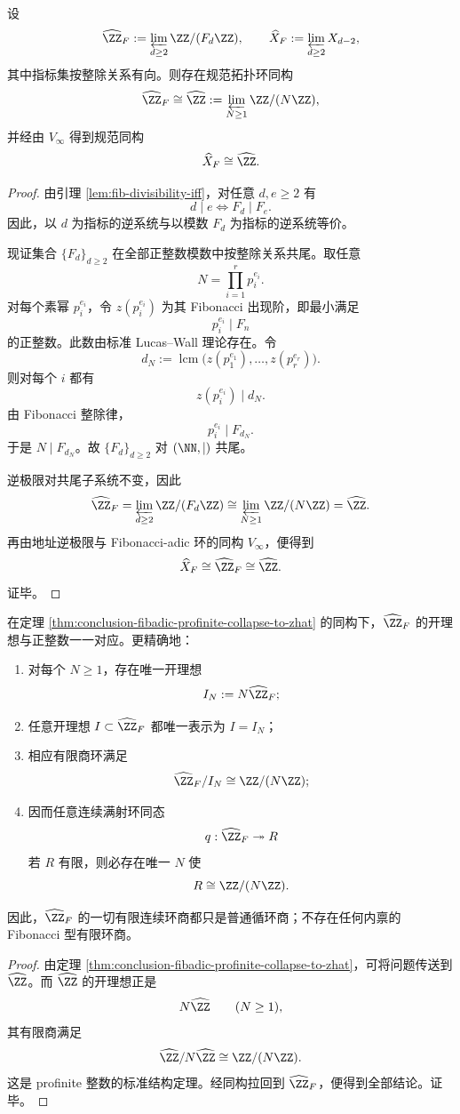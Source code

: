 \begin{theorem}\label{thm:conclusion-fibadic-profinite-collapse-to-zhat}
设
\[
\widehat{\ZZ}_F:=\varprojlim_{d\ge 2}\ZZ/(F_d\ZZ),
\qquad
\widehat X_F:=\varprojlim_{d\ge 2}X_{d-2},
\]
其中指标集按整除关系有向。则存在规范拓扑环同构
\[
\widehat{\ZZ}_F\cong \widehat{\ZZ}:=\varprojlim_{N\ge 1}\ZZ/(N\ZZ),
\]
并经由 \(V_\infty\) 得到规范同构
\[
\widehat X_F\cong \widehat{\ZZ}.
\]
\end{theorem}
\begin{proof}
由引理 \ref{lem:fib-divisibility-iff}，对任意 \(d,e\ge 2\) 有
\[
d\mid e \iff F_d\mid F_e.
\]
因此，以 \(d\) 为指标的逆系统与以模数 \(F_d\) 为指标的逆系统等价。

现证集合 \(\{F_d\}_{d\ge 2}\) 在全部正整数模数中按整除关系共尾。取任意
\[
N=\prod_{i=1}^r p_i^{e_i}.
\]
对每个素幂 \(p_i^{e_i}\)，令 \(z(p_i^{e_i})\) 为其 Fibonacci 出现阶，即最小满足
\[
p_i^{e_i}\mid F_n
\]
的正整数。此数由标准 Lucas--Wall 理论存在。令
\[
d_N:=\operatorname{lcm}\bigl(z(p_1^{e_1}),\dots,z(p_r^{e_r})\bigr).
\]
则对每个 \(i\) 都有
\[
z(p_i^{e_i})\mid d_N.
\]
由 Fibonacci 整除律，
\[
p_i^{e_i}\mid F_{d_N}.
\]
于是 \(N\mid F_{d_N}\)。故 \(\{F_d\}_{d\ge 2}\) 对 \((\NN,\mid)\) 共尾。

逆极限对共尾子系统不变，因此
\[
\widehat{\ZZ}_F
=
\varprojlim_{d\ge 2}\ZZ/(F_d\ZZ)
\cong
\varprojlim_{N\ge 1}\ZZ/(N\ZZ)
=
\widehat{\ZZ}.
\]
再由地址逆极限与 Fibonacci-adic 环的同构 \(V_\infty\)，便得到
\[
\widehat X_F\cong \widehat{\ZZ}_F\cong \widehat{\ZZ}.
\]
证毕。
\end{proof}

\begin{theorem}[有限商刚性与开理想的算术分类]\label{thm:conclusion-fibadic-open-ideal-finite-quotient-classification}
在定理 \ref{thm:conclusion-fibadic-profinite-collapse-to-zhat} 的同构下，\(\widehat{\ZZ}_F\) 的开理想与正整数一一对应。更精确地：
\begin{enumerate}
  \item 对每个 \(N\ge 1\)，存在唯一开理想
  \[
  I_N:=N\widehat{\ZZ}_F;
  \]
  \item 任意开理想 \(I\subset \widehat{\ZZ}_F\) 都唯一表示为 \(I=I_N\)；
  \item 相应有限商环满足
  \[
  \widehat{\ZZ}_F/I_N\cong \ZZ/(N\ZZ);
  \]
  \item 因而任意连续满射环同态
  \[
  q:\widehat{\ZZ}_F\twoheadrightarrow R
  \]
  若 \(R\) 有限，则必存在唯一 \(N\) 使
  \[
  R\cong \ZZ/(N\ZZ).
  \]
\end{enumerate}
因此，\(\widehat{\ZZ}_F\) 的一切有限连续环商都只是普通循环商；不存在任何内禀的 Fibonacci 型有限环商。
\end{theorem}
\begin{proof}
由定理 \ref{thm:conclusion-fibadic-profinite-collapse-to-zhat}，可将问题传送到 \(\widehat{\ZZ}\)。而 \(\widehat{\ZZ}\) 的开理想正是
\[
N\widehat{\ZZ}\qquad (N\ge 1),
\]
其有限商满足
\[
\widehat{\ZZ}/N\widehat{\ZZ}\cong \ZZ/(N\ZZ).
\]
这是 profinite 整数的标准结构定理。经同构拉回到 \(\widehat{\ZZ}_F\)，便得到全部结论。证毕。
\end{proof}


